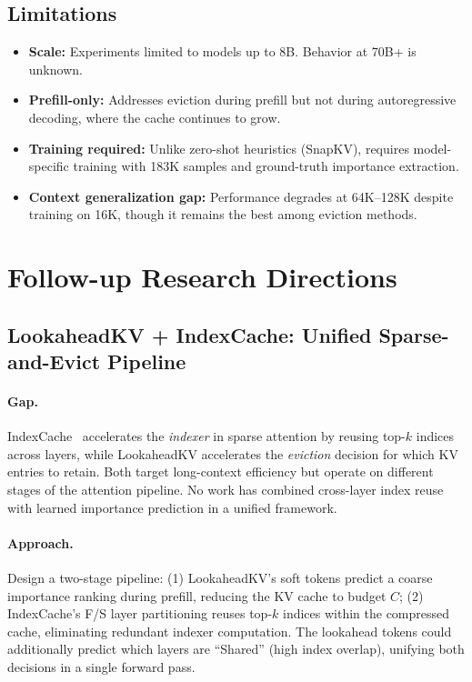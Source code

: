 \documentclass[11pt]{article}
\begin{document}
\subsection{Limitations}
\begin{itemize}
    \item \textbf{Scale:} Experiments limited to models up to 8B. Behavior at 70B+ is unknown.
    \item \textbf{Prefill-only:} Addresses eviction during prefill but not during autoregressive decoding, where the cache continues to grow.
    \item \textbf{Training required:} Unlike zero-shot heuristics (SnapKV), requires model-specific training with 183K samples and ground-truth importance extraction.
    \item \textbf{Context generalization gap:} Performance degrades at 64K--128K despite training on 16K, though it remains the best among eviction methods.
\end{itemize}

\section{Follow-up Research Directions}

\subsection{LookaheadKV + IndexCache: Unified Sparse-and-Evict Pipeline}

\paragraph{Gap.}
IndexCache~\cite{indexcache} accelerates the \emph{indexer} in sparse attention by reusing top-$k$ indices across layers, while LookaheadKV accelerates the \emph{eviction} decision for which KV entries to retain. Both target long-context efficiency but operate on different stages of the attention pipeline. No work has combined cross-layer index reuse with learned importance prediction in a unified framework.

\paragraph{Approach.}
Design a two-stage pipeline: (1) LookaheadKV's soft tokens predict a coarse importance ranking during prefill, reducing the KV cache to budget $C$; (2) IndexCache's F/S layer partitioning reuses top-$k$ indices within the compressed cache, eliminating redundant indexer computation. The lookahead tokens could additionally predict which layers are ``Shared'' (high index overlap), unifying both decisions in a single forward pass.
\end{document}
